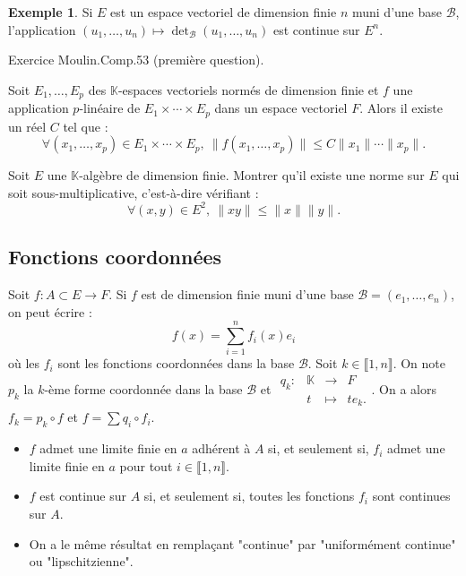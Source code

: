 \documentclass[french]{article}
\newcommand{\K}{\mathbb{K}}
\theoremstyle{plain}
\theoremstyle{definition}
\newtheorem*{ex}{Exemple}
\theoremstyle{remark}
\begin{document}
\begin{ex}
	Si $E$ est un espace vectoriel de dimension finie $n$ muni d'une base $\mathcal{B}$, l'application $(u_1,\ldots,u_n)\mapsto\det_\mathcal{B}(u_1,\ldots,u_n)$ est continue sur $E^n$.
\end{ex}

Exercice Moulin.Comp.53 (première question).

\begin{cor}%
	Soit $E_1,\ldots,E_p$ des $\K$-espaces vectoriels normés de dimension finie et $f$ une application $p$-linéaire de $E_1\times\cdots\times E_p$ dans un espace vectoriel $F$. Alors il existe un réel $C$ tel que : $$\forall (x_1,\ldots,x_p)\in E_1\times\cdots\times E_p,\ \lVert f(x_1,\ldots,x_p)\rVert\leqslant C\lVert x_1\rVert\cdots\lVert x_p\rVert.$$
\end{cor}

\begin{exo}
	Soit $E$ une $\K$-algèbre de dimension finie. Montrer qu'il existe une norme sur $E$ qui soit sous-multiplicative, c'est-à-dire vérifiant : $$\forall (x,y)\in E^2,\ \lVert xy\rVert\leqslant\lVert x\rVert\lVert y\rVert.$$
\end{exo}

\subsection{Fonctions coordonnées}

Soit $f:A\subset E\to F$. Si $f$ est de dimension finie muni d'une base $\mathcal{B}=(e_1,\ldots,e_n)$, on peut écrire : $$f(x)=\sum_{i=1}^{n}f_i(x)e_i$$ où les $f_i$ sont les fonctions coordonnées dans la base $\mathcal{B}$. Soit $k\in\llbracket1,n\rrbracket$. On note $p_k$ la $k$-ème forme coordonnée dans la base $\mathcal{B}$ et $\begin{array}{lrcl}
	q_k:&\K&\longrightarrow& F\\
	&t&\longmapsto& te_k.
\end{array}$.
On a alors $f_k=p_k\circ f$ et $f=\displaystyle\sum q_i\circ f_i$.

\begin{met}
	\begin{itemize}
		\item $f$ admet une limite finie en $a$ adhérent à $A$ si, et seulement si, $f_i$ admet une limite finie en $a$ pour tout $i\in\llbracket1,n\rrbracket$.
		\item $f$ est continue sur $A$ si, et seulement si, toutes les fonctions $f_i$ sont continues sur $A$.
		\item On a le même résultat en remplaçant "continue" par "uniformément continue" ou "lipschitzienne".
	\end{itemize}
\end{met}
\end{document}
